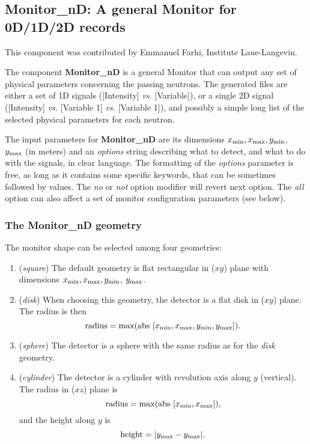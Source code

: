 \subsection{Monitor\_nD: A general Monitor for 0D/1D/2D records}
\label{s:monitornd}

This component was contributed by Emmanuel Farhi, Institute
Laue-Langevin.

The component {\bf Monitor\_nD} is a general Monitor that can output any
set of physical parameters concerning the passing neutrons. The
generated files are either a set of 1D signals ([Intensity] {\it vs.}
[Variable]), or a single 2D signal ([Intensity] {\it vs.} [Variable 1]
{\it vs.} [Variable 1]), and possibly a simple long list of the selected
physical parameters for each neutron.

The input parameters for {\bf Monitor\_nD} are its dimensions $x_{\rm
  min}, x_{\rm max}, y_{\rm min}$, $y_{\rm max}$ (in meters) and an {\it
  options} string describing what to detect, and what to do with the
signals, in clear language. The formatting of the {\it options}
parameter is free, as long as it contains some specific keywords, that
can be sometimes followed by values. The {\it no} or {\it not} option
modifier will revert next option. The {\it all} option can also affect a
set of monitor configuration parameters (see below).

\subsubsection{The Monitor\_nD geometry}

The monitor shape can be selected among four geometries:
\begin{enumerate}
\item{({\it square}) The default geometry is flat rectangular in ($xy$)
    plane with dimensions $x_{\rm min}, x_{\rm max}, y_{\rm min}$,
    $y_{\rm max}$.}
\item{({\it disk}) When choosing this geometry, the detector is a flat
    disk in ($xy$) plane. The radius is then
    \begin{equation}
      \mbox{radius} = \max ( \mbox{abs } [ x_{\rm min}, x_{\rm max}, y_{\rm
        min}, y_{\rm max} ] ).
    \end{equation}
    }
\item{({\it sphere}) The detector is a sphere with the same radius as
    for the {\it disk} geometry.}
\item{({\it cylinder}) The detector is a cylinder with revolution axis
    along $y$ (vertical). The radius in ($xz$) plane is
    \begin{equation}
      \mbox{radius} =  \max ( \mbox{abs } [ x_{\rm min}, x_{\rm max} ] ),
    \end{equation}
    and the height along $y$ is 
    \begin{equation}
      \mbox{height} =  | y_{\rm max} - y_{\rm max} |.
    \end{equation}
    }
\end{enumerate}

